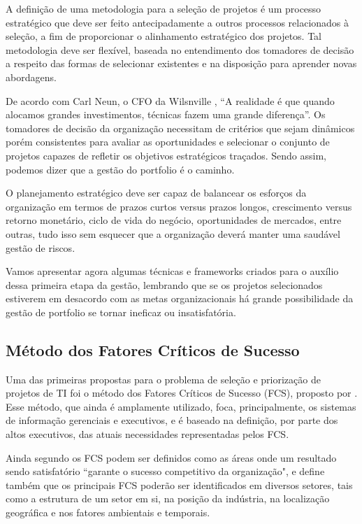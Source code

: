 \documentclass[12pt,a4paper,ruledheader,tocpage=prefix,floatnumber=continuous,pagestart=folhaderosto,font=times]{abnt}
\begin{document}
A definição de uma metodologia para a seleção de projetos é um processo estratégico que deve ser feito antecipadamente a outros processos relacionados à 
seleção, a fim de proporcionar o alinhamento estratégico dos projetos. Tal metodologia deve ser flexível, baseada no entendimento dos tomadores de 
decisão a respeito das formas de selecionar existentes e na disposição para aprender novas abordagens\cite{archer}.

De acordo com Carl Neun, o CFO da Wilsnville \cite{johnson}, “A realidade é que quando alocamos grandes investimentos, técnicas fazem uma grande 
diferença”. Os tomadores de decisão da organização necessitam de critérios que sejam dinâmicos porém consistentes para avaliar as oportunidades e selecionar
o conjunto de projetos capazes de refletir os objetivos estratégicos traçados. Sendo assim, podemos dizer que a gestão do portfolio é o caminho.

O planejamento estratégico deve ser capaz de balancear os esforços da organização em termos de prazos curtos versus prazos longos, crescimento versus retorno
monetário, ciclo de vida do negócio, oportunidades de mercados, entre outras, tudo isso sem esquecer que a organização deverá manter uma saudável gestão
de riscos.

Vamos apresentar agora algumas técnicas e frameworks criados para o auxílio dessa primeira etapa da gestão, lembrando que se os projetos selecionados 
estiverem em desacordo com as metas organizacionais há grande possibilidade da gestão de portfolio se tornar ineficaz ou insatisfatória.

\subsection{Método dos Fatores Críticos de Sucesso}
Uma das primeiras propostas para o problema de seleção e priorização de projetos de TI foi o método dos Fatores Críticos de Sucesso (FCS),
proposto por \cite{rockart} . Esse método, que ainda é amplamente utilizado, foca, principalmente, os sistemas de informação gerenciais
e executivos, e é baseado na definição, por parte dos altos executivos, das atuais necessidades representadas pelos FCS.

Ainda segundo\cite{rockart} os FCS podem ser definidos como as áreas onde um resultado sendo satisfatório ``garante o sucesso competitivo da organização",
e define também que os principais FCS poderão ser identificados em diversos setores, tais como a estrutura de um setor em si, na posição da indústria, 
na localização geográfica e nos fatores ambientais e temporais.
\end{document}
